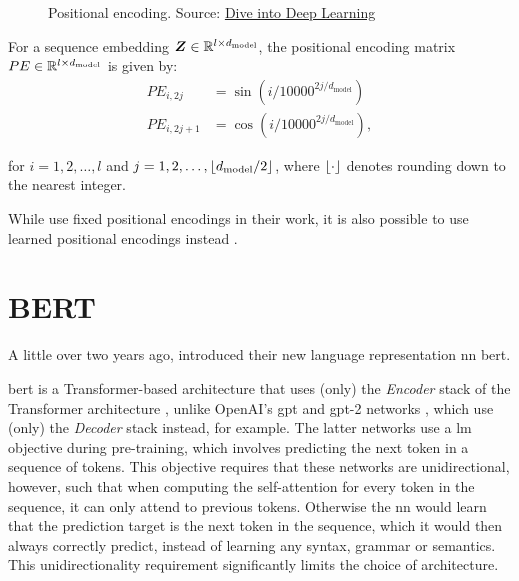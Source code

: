 \begin{figure*}[ht!]
    \centering
    \def\svgscale{0.8}
    
    \caption[Positional encoding]{Positional encoding. Source: \href{https://d2l.ai/chapter_attention-mechanisms/self-attention-and-positional-encoding.html\#positional-encoding}{Dive into Deep Learning}}
    \label{fig:positional_encoding}
\end{figure*}

For a sequence embedding $\vect{Z} \in \reals{l \times d_{\text{model}}}$, the positional encoding matrix $PE \in \mathbb{R}^{l \times d_{\text{model}}}$ is given by:
\begin{align}
    PE_{i,2j} &= \sin{\left( i / 10000^{2j / d_{\text{model}}}  \right)} \\
    PE_{i,2j+1} &= \cos{\left( i / 10000^{2j / d_{\text{model}}}  \right)},
\end{align}

for $i = 1, 2, \dots, l$ and $j = 1, 2, \dots, \left\lfloor {d_{\text{model}} / 2} \right\rfloor$, where $\left\lfloor {\cdot} \right\rfloor$ denotes rounding down to the nearest integer.

While \citet{vaswani2017attention} use fixed positional encodings in their work, it is also possible to use learned positional encodings instead \citep{devlin2018bert}.



\section{BERT}
\label{sec:bert}
A little over two years ago, \citet{devlin2018bert} introduced their new language representation \gls{nn} \gls{bert}.

\gls{bert} is a Transformer-based architecture that uses (only) the \emph{Encoder} stack of the Transformer architecture \citep{vaswani2017attention}, unlike OpenAI's \gls{gpt} and \gls{gpt}-2 networks \citep{radford2018improving,radford2019language}, which use (only) the \emph{Decoder} stack instead, for example. The latter networks use a \gls{lm} objective during pre-training, which involves predicting the next token in a sequence of tokens. This objective requires that these networks are unidirectional, however, such that when computing the self-attention for every token in the sequence, it can only attend to previous tokens. Otherwise the \gls{nn} would learn that the prediction target is the next token in the sequence, which it would then always correctly predict, instead of learning any syntax, grammar or semantics. This unidirectionality requirement significantly limits the choice of architecture.

